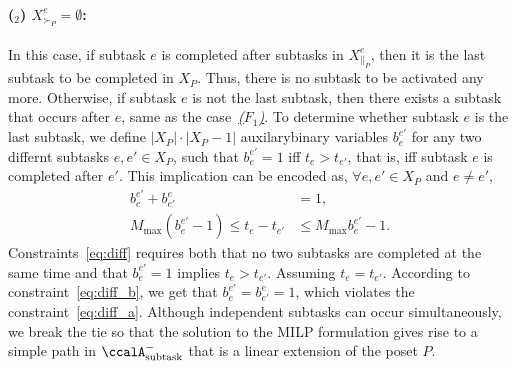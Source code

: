 \documentclass[Afour,sageh,times]{sagej}
\newcounter{mycounter}
\newcommand{\auto}[1]{\ccalA_{\textup{#1}}}
\begin{document}
{{{\paragraph{($_2$) $ X^e_{\succ_{P}} = \emptyset$:}\label{activation:b} In this case, if subtask $e$ is completed after  subtasks in  $X_{\|_P}^e$, then it is the last  subtask  to be completed in  $X_P$. Thus, there is no subtask to be activated any more. Otherwise, if subtask $e$ is not the last subtask, then there exists a subtask that occurs after $e$, same as the case~\hyperref[activation:a]{\it ($F_1$)}. To determine whether subtask $e$ is the last subtask, we define $|X_P|\cdot |X_P -1|$ auxilarybinary variables $b_{e}^{e'}$ for any two differnt subtasks  $e, e' \in X_P$,  such that $b_{e}^{e'}=1$  iff $t_{e} > t_{e'}$, that is, iff subtask $e$ is completed after $e'$. This implication can be encoded as, $\forall e, e' \in X_P $ and $e\neq e'$,
\begingroup\makeatletter\def\f@size{10}\check@mathfonts
\def\maketag@@@#1{\hbox{\m@th\normalsize\normalfont#1}}%
\begin{subequations}\label{eq:diff}
  \begin{align}
    b_e^{e'} + b_{e'}^e &  = 1, \label{eq:diff_a}\\
  M_{\text{max}} (b_{e}^{e'} - 1) \leq t_e -  t_{e'} & \leq M_{\text{max}} b_{e}^{e'} - 1. \label{eq:diff_b}
\end{align}
\end{subequations}
\endgroup
Constraints~\eqref{eq:diff} requires both that  no two subtasks are completed at the same time and that $b_e^{e'}=1$ implies $t_e > t_{e'}$. Assuming $t_e = t_{e'}$. According to constraint~\eqref{eq:diff_b}, we get that $b_e^{e'}=b_{e'}^{e}=1$, which violates the constraint~\eqref{eq:diff_a}. Although independent subtasks can occur simultaneously, we break the tie so that the solution to the MILP formulation gives rise to a simple path in $\auto{subtask}^-$ that is a linear extension of the poset $P$.%

}}}
\end{document}
